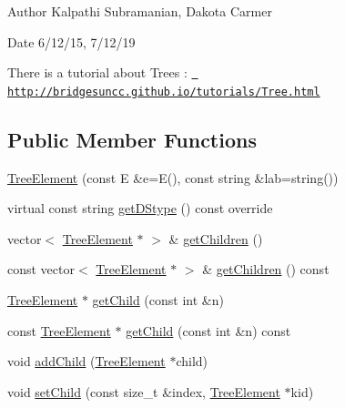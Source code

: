 \begin{DoxyAuthor}{Author}
Kalpathi Subramanian, Dakota Carmer 
\end{DoxyAuthor}
\begin{DoxyDate}{Date}
6/12/15, 7/12/19
\end{DoxyDate}
There is a tutorial about Trees \+: \href{http://bridgesuncc.github.io/tutorials/Tree.html}{\texttt{ http\+://bridgesuncc.\+github.\+io/tutorials/\+Tree.\+html}} \subsection*{Public Member Functions}
\begin{DoxyCompactItemize}
\item 
\mbox{\hyperlink{classbridges_1_1datastructure_1_1_tree_element_a0d719458938ba46a509635591ba2290b}{Tree\+Element}} (const E \&e=E(), const string \&lab=string())
\item 
virtual const string \mbox{\hyperlink{classbridges_1_1datastructure_1_1_tree_element_a897f34ea284da45e1dc869c3e3b6c9a4}{get\+D\+Stype}} () const override
\item 
vector$<$ \mbox{\hyperlink{classbridges_1_1datastructure_1_1_tree_element}{Tree\+Element}} $\ast$ $>$ \& \mbox{\hyperlink{classbridges_1_1datastructure_1_1_tree_element_a3ea19ec0178ceb531a707d87d6fd42d3}{get\+Children}} ()
\item 
const vector$<$ \mbox{\hyperlink{classbridges_1_1datastructure_1_1_tree_element}{Tree\+Element}} $\ast$ $>$ \& \mbox{\hyperlink{classbridges_1_1datastructure_1_1_tree_element_a1fc634a6eaab3800f925429ace209469}{get\+Children}} () const
\item 
\mbox{\hyperlink{classbridges_1_1datastructure_1_1_tree_element}{Tree\+Element}} $\ast$ \mbox{\hyperlink{classbridges_1_1datastructure_1_1_tree_element_a7b4c553cd11b169fa4ab5c3dacc371a1}{get\+Child}} (const int \&n)
\item 
const \mbox{\hyperlink{classbridges_1_1datastructure_1_1_tree_element}{Tree\+Element}} $\ast$ \mbox{\hyperlink{classbridges_1_1datastructure_1_1_tree_element_a858d9ce29eb7256d058e8ee2daf4ef4f}{get\+Child}} (const int \&n) const
\item 
void \mbox{\hyperlink{classbridges_1_1datastructure_1_1_tree_element_a4c05db5e970707e1421fe664bc4ef3b7}{add\+Child}} (\mbox{\hyperlink{classbridges_1_1datastructure_1_1_tree_element}{Tree\+Element}} $\ast$child)
\item 
void \mbox{\hyperlink{classbridges_1_1datastructure_1_1_tree_element_ad894ec5edfa66ddf59dd83a8712b48f1}{set\+Child}} (const size\+\_\+t \&index, \mbox{\hyperlink{classbridges_1_1datastructure_1_1_tree_element}{Tree\+Element}} $\ast$kid)
\end{DoxyCompactItemize}
